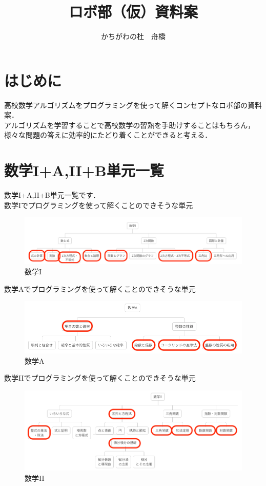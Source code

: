 \documentclass[dvipdfmx]{jsarticle}
\begin{document}
\title{ロボ部（仮）資料案}
\author{かちがわの杜　舟橋}
\maketitle

\section{はじめに}
高校数学アルゴリズムをプログラミングを使って解くコンセプトなロボ部の資料案．\\
アルゴリズムを学習することで高校数学の習熟を手助けすることはもちろん，様々な問題の答えに効率的にたどり着くことができると考える．
\section{数学I+A,II+B単元一覧\cite{tangen}}
数学I+A,II+B単元一覧です．\\
数学Iでプログラミングを使って解くことのできそうな単元
\begin{figure}[H]
  \centering
  \includegraphics[width=15cm]{1.png}
  \caption{数学I}
\end{figure}
数学Aでプログラミングを使って解くことのできそうな単元
\begin{figure}[H]
  \centering
  \includegraphics[width=15cm]{A.png}
  \caption{数学A}
\end{figure}
数学IIでプログラミングを使って解くことのできそうな単元
\begin{figure}[H]
  \centering
  \includegraphics[width=15cm]{2.png}
  \caption{数学II}
\end{figure}
\end{document}
